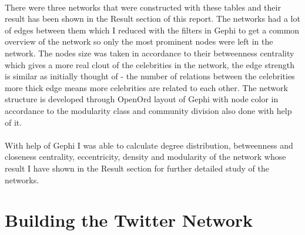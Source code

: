 \documentclass[runningheads,a4paper]{llncs}
\begin{document}
\paragraph{}
There were three networks that were constructed with these tables and their result has been shown in the Result section of this report. The networks had a lot of edges between them which I reduced with the filters in Gephi to get a common overview of the network so only the most prominent nodes were left in the network. The nodes size was taken in accordance to their betweenness centrality which gives a more real clout of the celebrities in the network, the edge strength is similar as initially thought of - the number of relations between the celebrities more thick edge means more celebrities are related to each other. The network structure is developed through OpenOrd layout of Gephi with node color in accordance to the modularity class and community division also done with help of it.

\paragraph{}
With help of Gephi I was able to calculate degree distribution, betweenness and closeness centrality, eccentricity, density and modularity of the network whose result I have shown in the Result section for further detailed study of the networks.

%
%
%
%
%
%

\section{Building the Twitter Network}
\end{document}
